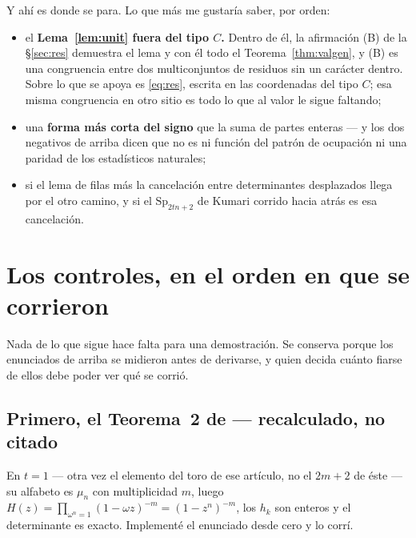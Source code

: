 \documentclass[11pt,a4paper]{article}
\newcommand{\Sp}{\mathrm{Sp}}
\begin{document}
Y ahí es donde se para. Lo que más me gustaría saber, por orden:
\begin{itemize}\itemsep2pt
\item el \textbf{Lema~\ref{lem:unit} fuera del tipo $C$.} Dentro de él, la afirmación (B) de la
\S\ref{sec:res} demuestra el lema y con él todo el Teorema~\ref{thm:valgen}, y (B) es una
congruencia entre dos multiconjuntos de residuos sin un carácter dentro. Sobre lo que se apoya es
\eqref{eq:res}, escrita en las coordenadas del tipo $C$; esa misma congruencia en otro sitio es todo
lo que al valor le sigue faltando;
\item una \textbf{forma más corta del signo} que la suma de partes enteras --- y los dos negativos
de arriba dicen que no es ni función del patrón de ocupación ni una paridad de los estadísticos
naturales;
\item si el lema de filas más la cancelación entre determinantes desplazados llega por el otro
camino, y si el $\Sp_{2tn+2}$ de Kumari \cite{Kum24} corrido hacia atrás es esa cancelación.
\end{itemize}

\section{Los controles, en el orden en que se corrieron}\label{sec:controles}

Nada de lo que sigue hace falta para una demostración. Se conserva porque los enunciados de arriba se
midieron antes de derivarse, y quien decida cuánto fiarse de ellos debe poder ver qué se corrió.


\subsection*{Primero, el Teorema~2 de \cite{Prasad16b} --- recalculado, no citado}

En $t=1$ --- otra vez el elemento del toro de ese artículo, no el $2m+2$ de éste --- su alfabeto es
$\mu_n$ con multiplicidad $m$, luego
$H(z)=\prod_{\omega^n=1}(1-\omega z)^{-m}=(1-z^n)^{-m}$, los $h_k$ son enteros y el determinante es
exacto. Implementé el enunciado desde cero y lo corrí.
\end{document}
